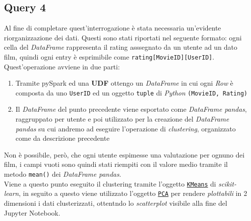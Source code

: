 \documentclass{article}
\begin{document}
    \newpage
    \subsection{Query 4}
        Al fine di completare quest'interrogazione è stata necessaria un'evidente riorganizzazione dei dati. Questi sono stati riportati nel seguente formato: ogni cella del \textit{DataFrame} rappresenta il rating asssegnato da un utente ad un dato film, quindi ogni entry è esprimibile come \texttt{rating[MovieID][UserID]}. Quest'operazione avviene in due parti:
        \begin{enumerate}
            \item Tramite pySpark ed una \textbf{UDF} ottengo un \textit{DataFrame} in cui ogni \textit{Row} è composta da uno \texttt{UserID} ed un oggetto \texttt{tuple} di \textit{Python} \texttt{(MovieID, Rating)}
            \item Il \textit{DataFrame} del punto precedente viene esportato come \textit{DataFrame pandas}, raggruppato per utente e poi utilizzato per la creazione del \textit{DataFrame pandas} su cui andremo ad eseguire l'operazione di \textit{clustering}, organizzato come da descrizione precedente
        \end{enumerate}
        Non è possibile, però, che ogni utente espimesse una valutazione per ognuno dei film, i campi vuoti sono quindi stati riempiti con il valore medio tramite il metodo \texttt{mean()} dei \textit{DataFrame pandas}.\\
        Viene a questo punto eseguito il clustering tramite l'oggetto \href{https://scikit-learn.org/stable/modules/generated/sklearn.cluster.KMeans.html}{\texttt{KMeans}} di \textit{scikit-learn}, in seguito a questo viene utilizzato l'oggetto \href{https://scikit-learn.org/stable/modules/generated/sklearn.decomposition.PCA.html}{\texttt{PCA}} per rendere \textit{plottabili} in 2 dimensioni i dati clusterizzati, ottentndo lo \textit{scatterplot} visibile alla fine del Jupyter Notebook.
\end{document}
